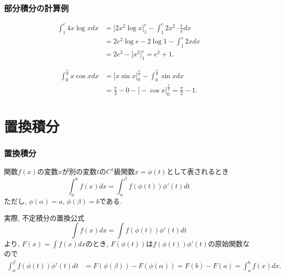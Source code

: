 

\begin{frame}
\frametitle{部分積分の計算例}


\begin{align*}
\int_1^{e} 4 x \log x dx & = \big[ 2x^2 \log x \big]_1^{e}- \int_1^e 2x^2 \cdot \frac{1}{x}dx \\
& = 2e^2 \log e - 2 \log 1 - \int_1^e2xdx \\
& = 2e^2-\big[x^2\big]_1^e = e^2+1. 
\end{align*}

\begin{align*}
\int_0^{\frac{\pi}{2}} x \cos x  dx & = \big[ x \sin x \big]_0^{\frac{\pi}{2}} - \int_0^{\frac{\pi}{2}} \sin x dx \\
& = \frac{\pi}{2}-0-\big[-\cos x \big]_0^{\frac{\pi}{2}}= \frac{\pi}{2}-1. 
\end{align*}

\end{frame}



\section{置換積分}

\begin{frame}
\frametitle{置換積分}

\begin{Thm}[置換積分の公式] 
関数$f(x)$の変数$x$が別の変数$t$の$C^1$級関数$x=\phi(t)$として表されるとき
$$
\int_a^b f(x)dx =\int_\alpha^\beta f(\phi(t))\phi'(t)dt
$$
ただし, $\phi(\alpha)=a$,  $\phi(\beta)=b$である. 
\end{Thm}
実際, 不定積分の置換公式
$$
\int f(x)dx =\int f(\phi(t))\phi'(t)dt
$$
より, $F(x)=\int f(x)dx$のとき, $F(\phi(t))$は$ f(\phi(t))\phi'(t)$の原始関数なので
\begin{align*}
\int_\alpha^\beta f(\phi(t))\phi'(t)dt &=  F(\phi(\beta))-F(\phi(\alpha))=F(b)-F(a)=\int_a^b f(x)dx. 
\end{align*}

\end{frame}




